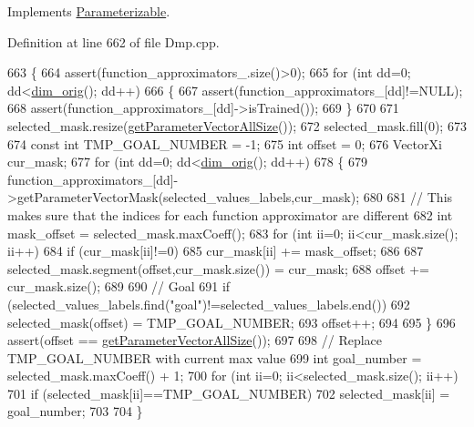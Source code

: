Implements \hyperlink{classDmpBbo_1_1Parameterizable_ae7f6cbc5723ed4734ded5f2ba59bd366}{Parameterizable}.



Definition at line 662 of file Dmp.\+cpp.


\begin{DoxyCode}
663 \{
664   assert(function\_approximators\_.size()>0);
665   \textcolor{keywordflow}{for} (\textcolor{keywordtype}{int} dd=0; dd<\hyperlink{group__DynamicalSystems_ga93d7cbbf2e471b00f124e41706405a05}{dim\_orig}(); dd++)
666   \{
667     assert(function\_approximators\_[dd]!=NULL);
668     assert(function\_approximators\_[dd]->isTrained());
669   \}
670 
671   selected\_mask.resize(\hyperlink{classDmpBbo_1_1Dmp_ab24d2485b3b795b516f4844f225100eb}{getParameterVectorAllSize}());
672   selected\_mask.fill(0);
673   
674   \textcolor{keyword}{const} \textcolor{keywordtype}{int} TMP\_GOAL\_NUMBER = -1;
675   \textcolor{keywordtype}{int} offset = 0;
676   VectorXi cur\_mask;
677   \textcolor{keywordflow}{for} (\textcolor{keywordtype}{int} dd=0; dd<\hyperlink{group__DynamicalSystems_ga93d7cbbf2e471b00f124e41706405a05}{dim\_orig}(); dd++)
678   \{
679     function\_approximators\_[dd]->getParameterVectorMask(selected\_values\_labels,cur\_mask);
680 
681     \textcolor{comment}{// This makes sure that the indices for each function approximator are different    }
682     \textcolor{keywordtype}{int} mask\_offset = selected\_mask.maxCoeff(); 
683     \textcolor{keywordflow}{for} (\textcolor{keywordtype}{int} ii=0; ii<cur\_mask.size(); ii++)
684       \textcolor{keywordflow}{if} (cur\_mask[ii]!=0)
685         cur\_mask[ii] += mask\_offset;
686         
687     selected\_mask.segment(offset,cur\_mask.size()) = cur\_mask;
688     offset += cur\_mask.size();
689     
690     \textcolor{comment}{// Goal}
691     \textcolor{keywordflow}{if} (selected\_values\_labels.find(\textcolor{stringliteral}{"goal"})!=selected\_values\_labels.end())
692       selected\_mask(offset) = TMP\_GOAL\_NUMBER;
693     offset++;
694     
695   \}
696   assert(offset == \hyperlink{classDmpBbo_1_1Dmp_ab24d2485b3b795b516f4844f225100eb}{getParameterVectorAllSize}());
697   
698   \textcolor{comment}{// Replace TMP\_GOAL\_NUMBER with current max value}
699   \textcolor{keywordtype}{int} goal\_number = selected\_mask.maxCoeff() + 1; 
700   \textcolor{keywordflow}{for} (\textcolor{keywordtype}{int} ii=0; ii<selected\_mask.size(); ii++)
701     \textcolor{keywordflow}{if} (selected\_mask[ii]==TMP\_GOAL\_NUMBER)
702       selected\_mask[ii] = goal\_number;
703     
704 \}
\end{DoxyCode}


